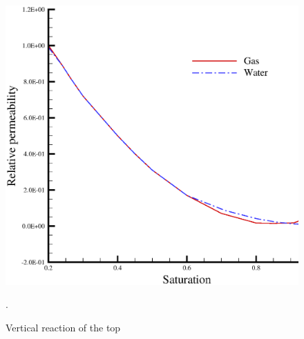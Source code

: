 \begin{figure}[!thb]
\begin{center}
\includegraphics[scale=0.3]{TH2M/figure/krel.eps}
\end{center}
\caption{Vertical reaction of the top}.
 \label{fig:th2m1_krel}
\end{figure}

